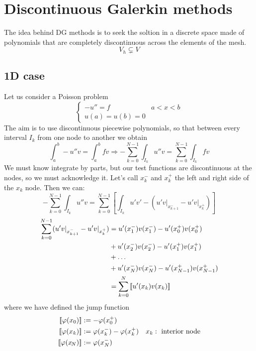 \newpage
\section{Discontinuous Galerkin methods}
The idea behind DG methods is to seek the soltion in a discrete space made of polynomials that are completely discontinuous across the elements of the mesh.
\[
    V_h \subsetneq V
\]
\subsection{1D case}
Let us consider a Poisson problem 
\[
    \begin{cases}
        -u'' = f & a < x < b \\
        u(a) = u(b) = 0
    \end{cases}
\]
The aim is to use discontinuous piecewise polynomials, so that between every interval \(I_k\) from one node to another we obtain
\[
    \int_{a}^b -u''v = \int_a^b fv \Rightarrow - \sum_{k=0}^{N-1} \int_{I_k} u''v = \sum_{k=0}^{N-1} \int_{I_k} fv
\]
We must know integrate by parts, but our test functions are discontinuous at the nodes, so we must acknowledge it. Let's call \(x_k^-\) and \(x_k^+\) the left and right side of the \(x_k\) node. Then we can:
\begin{equation}
    -\sum_{k=0}^{N-1} \int_{I_k} u''v = \sum_{k=0}^{N-1} \left[ \int_{I_k}u'v' - \left( u'v\vert_{x_{k+1}^-} - u'v\vert_{x_k^+} \right) \right] \label{integration_by_parts_dg}
\end{equation}
    \begin{align}
    \sum_{k=0}^{N-1} (u'v\vert_{x_{k+1}^-} - u'v\vert_{x_k^+}) &= u'(x_1^-)v(x_1^-) - u'(x_0^+)v(x_0^+) \nonumber\\
    & + u'(x_2^-)v(x_2^-) - u'(x_1^+)v(x_1^+) \nonumber\\
    & + \ldots \\
    & + u'(x_N^-)v(x_N^-) - u'(x_{N-1}^+)v(x_{N-1}^+) \nonumber\\
    & = \sum_{k=0}^{N} \left[\!\left[u'(x_k)v(x_k)\right]\!\right] \nonumber \label{step_for_jump_dg}
\end{align}
where we have defined the jump function
\begin{align}
    \left[\!\left[\varphi(x_0)\right]\!\right] &:= -\varphi(x^+_0) & \nonumber\\
    \left[\!\left[\varphi(x_k)\right]\!\right] &:= \varphi(x_k^-) -\varphi(x^+_k) & x_k :\text{ interior node} \\
    \left[\!\left[\varphi(x_{\!N})\right]\!\right] &:= \varphi(x^-_N) &\nonumber \label{jump_function}
\end{align}
